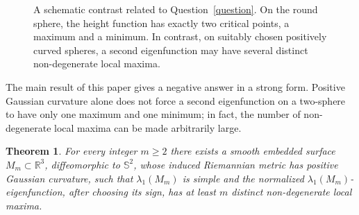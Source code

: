 \documentclass[11pt]{amsart}
\newtheorem{theorem}{Theorem}[section]
\numberwithin{equation}{section}
\newcommand{\R}{\mathbb R}
\begin{document}
\begin{figure}[htbp]
\caption{A schematic contrast related to Question~\ref{question}. 
On the round sphere, the height function has exactly two critical points,
a maximum and a minimum. In contrast, on suitably chosen positively curved spheres,
a second eigenfunction may have several distinct non-degenerate local maxima.}
\label{fig:question-motivation}
\end{figure}

The main result of this paper gives a negative answer in a strong form.  Positive
Gaussian curvature alone does not force a second eigenfunction on a two-sphere to
have only one maximum and one minimum; in fact, the number of non-degenerate
local maxima can be made arbitrarily large.

\begin{theorem}\label{thm:main}
For every integer $m\ge 2$ there exists a smooth embedded surface
$M_m\subset\R^3$, diffeomorphic to $\mathbb S^2$, whose induced Riemannian metric
has positive Gaussian curvature, such that $\lambda_1(M_m)$ is simple and the
normalized $\lambda_1(M_m)$-eigenfunction, after choosing its sign, has at least
$m$ distinct non-degenerate local maxima.
\end{theorem}
\end{document}
